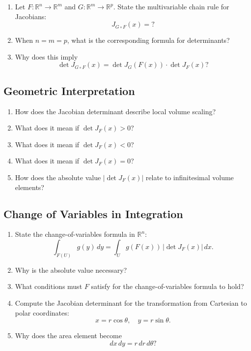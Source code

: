 \begin{enumerate}[resume]
  \item Let $F : \mathbb{R}^n \to \mathbb{R}^m$ and $G : \mathbb{R}^m \to \mathbb{R}^p$.
    State the multivariable chain rule for Jacobians:
    \[
      J_{G \circ F}(x) = ?
    \]
  \item When $n=m=p$, what is the corresponding formula for determinants?
  \item Why does this imply
    \[
      \det J_{G \circ F}(x)
      =
      \det J_G(F(x)) \cdot \det J_F(x)?
    \]
\end{enumerate}

\subsection{Geometric Interpretation}

\begin{enumerate}[resume]
  \item How does the Jacobian determinant describe local volume scaling?
  \item What does it mean if $\det J_F(x) > 0$?
  \item What does it mean if $\det J_F(x) < 0$?
  \item What does it mean if $\det J_F(x) = 0$?
  \item How does the absolute value $|\det J_F(x)|$ relate to infinitesimal volume elements?
\end{enumerate}

\subsection{Change of Variables in Integration}

\begin{enumerate}[resume]
  \item State the change-of-variables formula in $\mathbb{R}^n$:
    \[
      \int_{F(U)} g(y)\,dy
      =
      \int_U g(F(x))\, |\det J_F(x)| \, dx.
    \]
  \item Why is the absolute value necessary?
  \item What conditions must $F$ satisfy for the change-of-variables formula to hold?
  \item Compute the Jacobian determinant for the transformation from Cartesian to polar coordinates:
    \[
      x = r\cos\theta, \quad y = r\sin\theta.
    \]
  \item Why does the area element become
    \[
      dx\,dy = r\,dr\,d\theta?
    \]
\end{enumerate}

